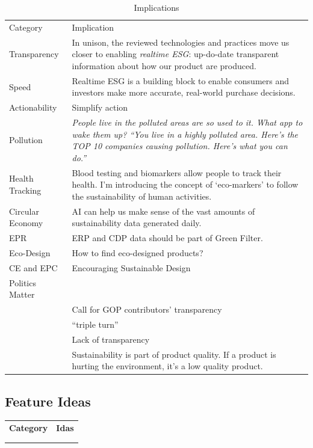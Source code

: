 \documentclass[
  letterpaper,
  DIV=11,
  numbers=noendperiod]{scrartcl}
\begin{document}
\begin{longtable}[]{@{}
  >{\raggedright\arraybackslash}p{}
  >{\raggedright\arraybackslash}p{}@{}}
\caption{Implications}\tabularnewline
\toprule\noalign{}
\endfirsthead
\endhead
\bottomrule\noalign{}
\endlastfoot
Category & Implication \\
Transparency & In unison, the reviewed technologies and practices move
us closer to enabling \emph{realtime ESG}: up-do-date transparent
information about how our product are produced. \\
Speed & Realtime ESG is a building block to enable consumers and
investors make more accurate, real-world purchase decisions. \\
Actionability & Simplify action \\
Pollution & \emph{People live in the polluted areas are so used to it.
What app to wake them up? ``You live in a highly polluted area. Here's
the TOP 10 companies causing pollution. Here's what you can do.''} \\
Health Tracking & Blood testing and biomarkers allow people to track
their health. I'm introducing the concept of `eco-markers' to follow the
sustainability of human activities. \\
Circular Economy & AI can help us make sense of the vast amounts of
sustainability data generated daily. \\
EPR & ERP and CDP data should be part of Green Filter. \\
Eco-Design & How to find eco-designed products? \\
CE and EPC & Encouraging Sustainable Design \\
Politics Matter & \\
& Call for GOP contributors' transparency \\
& ``triple turn'' \\
& Lack of transparency \\
& Sustainability is part of product quality. If a product is hurting the
environment, it's a low quality product. \\
\end{longtable}

\subsection{Feature Ideas}\label{feature-ideas-1}

\begin{longtable}[]{@{}ll@{}}
\toprule\noalign{}
\endhead
\bottomrule\noalign{}
\endlastfoot
\textbf{Category} & \textbf{Idas} \\
& \\
& \\
\end{longtable}
\end{document}
